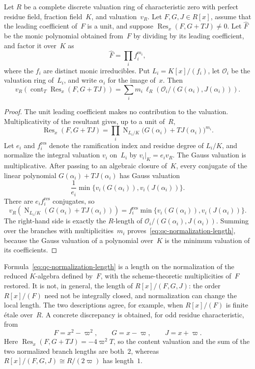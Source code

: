\begin{proposition}
\label{prop:qc-normalization-length}
Let $R$ be a complete discrete valuation ring of characteristic zero
with perfect residue field, fraction field~$K$, and valuation~$v_R$.
Let $F,G,J\in R[x]$,
assume that the leading coefficient of~$F$ is a unit, and suppose
$\operatorname{Res}_x(F,G+TJ)\ne0$.  Let $\widehat F$ be the monic
polynomial obtained from~$F$ by dividing by its leading coefficient, and
factor it over~$K$ as
\[
 \widehat F=\prod_i f_i^{m_i},
\]
where the $f_i$ are distinct monic irreducibles.  Put
$L_i=K[x]/(f_i)$, let $\mathcal O_i$ be the valuation ring of~$L_i$,
and write $\alpha_i$ for the image of~$x$.  Then
\begin{equation}\label{eq:qc-normalization-length}
 v_R\!\left(\operatorname{cont}_T
       \operatorname{Res}_x(F,G+TJ)\right)
 =\sum_i m_i\,
   \ell_R\!\left(
    \mathcal O_i/(G(\alpha_i),J(\alpha_i))
   \right).
\end{equation}
\end{proposition}

\begin{proof}
The unit leading coefficient makes no contribution to the valuation.
Multiplicativity of the resultant gives, up to a unit of~$R$,
\[
 \operatorname{Res}_x(F,G+TJ)
 =\prod_i
   \operatorname N_{L_i/K}
       \bigl(G(\alpha_i)+T J(\alpha_i)\bigr)^{m_i}.
\]
Let $e_i$ and $f_i^{\mathrm{res}}$ denote the ramification index and
residue degree of $L_i/K$, and normalize the integral valuation
$v_i$ on~$L_i$ by $v_i|_K=e_i v_R$.  The Gauss valuation is
multiplicative.  After passing to an algebraic closure of~$K$, every
conjugate of the linear polynomial
$G(\alpha_i)+TJ(\alpha_i)$ has Gauss valuation
\[
 \frac1{e_i}\min\{v_i(G(\alpha_i)),v_i(J(\alpha_i))\}.
\]
There are $e_i f_i^{\mathrm{res}}$ conjugates, so
\[
 v_R\!\left(
  \operatorname N_{L_i/K}(G(\alpha_i)+TJ(\alpha_i))
 \right)
 =f_i^{\mathrm{res}}
  \min\{v_i(G(\alpha_i)),v_i(J(\alpha_i))\}.
\]
The right-hand side is exactly the $R$-length of
$\mathcal O_i/(G(\alpha_i),J(\alpha_i))$.  Summing over the branches
with multiplicities~$m_i$ proves~\eqref{eq:qc-normalization-length},
because the Gauss valuation of a polynomial over~$K$ is the minimum
valuation of its coefficients.
\end{proof}

\begin{remark}
Formula~\eqref{eq:qc-normalization-length} is a length on the
normalization of the reduced $K$-algebra defined by~$F$, with the
scheme-theoretic multiplicities of~$F$ restored.  It is not, in
general, the length of $R[x]/(F,G,J)$: the order $R[x]/(F)$ need not
be integrally closed, and normalization can change the local length.
The two descriptions agree, for example, when $R[x]/(F)$ is finite
\'{e}tale over~$R$.  A concrete discrepancy is obtained, for odd
residue characteristic, from
\[
 F=x^2-\varpi^2,\qquad G=x-\varpi,\qquad J=x+\varpi.
\]
Here
$\operatorname{Res}_x(F,G+TJ)=-4\varpi^2T$, so the content valuation
and the sum of the two normalized branch lengths are both~$2$,
whereas $R[x]/(F,G,J)\cong R/(2\varpi)$ has length~$1$.
\end{remark}

